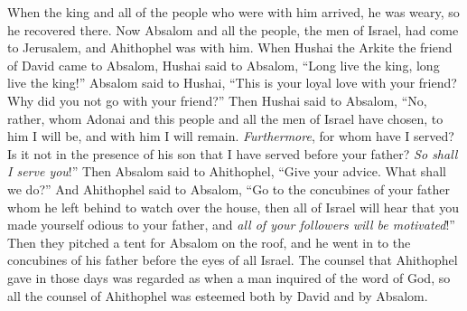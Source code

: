\begin{biblechapter}
\verse When the king and all of the people who were with him arrived, he was weary, so he recovered there.
 Now Absalom and all the people, the men of Israel, had come to Jerusalem, and Ahithophel was with him.
\verse When Hushai the Arkite the friend of David came to Absalom, Hushai said to Absalom, “Long live the king, long live the king!”
\verse Absalom said to Hushai, “This is your loyal love with your friend? Why did you not go with your friend?”
\verse Then Hushai said to Absalom, “No, rather, whom Adonai and this people and all the men of Israel have chosen, to him I will be, and with him I will remain.
\verse \textit{Furthermore}, for whom have I served? Is it not in the presence of his son that I have served before your father? \textit{So shall I serve you}!”
\verse Then Absalom said to Ahithophel, “Give your advice. What shall we do?”
\verse And Ahithophel said to Absalom, “Go to the concubines of your father whom he left behind to watch over the house, then all of Israel will hear that you made yourself odious to your father, and \textit{all of your followers will be motivated}!”
\verse Then they pitched a tent for Absalom on the roof, and he went in to the concubines of his father before the eyes of all Israel.
\verse The counsel that Ahithophel gave in those days was regarded as when a man inquired of the word of God, so all the counsel of Ahithophel was esteemed both by David and by Absalom.
\end{biblechapter}

